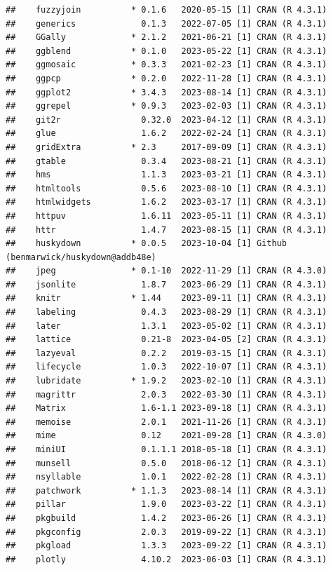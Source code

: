 \documentclass[print]{nuthesis}
\begin{document}
\begin{verbatim}
##    fuzzyjoin          * 0.1.6   2020-05-15 [1] CRAN (R 4.3.1)
##    generics             0.1.3   2022-07-05 [1] CRAN (R 4.3.1)
##    GGally             * 2.1.2   2021-06-21 [1] CRAN (R 4.3.1)
##    ggblend            * 0.1.0   2023-05-22 [1] CRAN (R 4.3.1)
##    ggmosaic           * 0.3.3   2021-02-23 [1] CRAN (R 4.3.1)
##    ggpcp              * 0.2.0   2022-11-28 [1] CRAN (R 4.3.1)
##    ggplot2            * 3.4.3   2023-08-14 [1] CRAN (R 4.3.1)
##    ggrepel            * 0.9.3   2023-02-03 [1] CRAN (R 4.3.1)
##    git2r                0.32.0  2023-04-12 [1] CRAN (R 4.3.1)
##    glue                 1.6.2   2022-02-24 [1] CRAN (R 4.3.1)
##    gridExtra          * 2.3     2017-09-09 [1] CRAN (R 4.3.1)
##    gtable               0.3.4   2023-08-21 [1] CRAN (R 4.3.1)
##    hms                  1.1.3   2023-03-21 [1] CRAN (R 4.3.1)
##    htmltools            0.5.6   2023-08-10 [1] CRAN (R 4.3.1)
##    htmlwidgets          1.6.2   2023-03-17 [1] CRAN (R 4.3.1)
##    httpuv               1.6.11  2023-05-11 [1] CRAN (R 4.3.1)
##    httr                 1.4.7   2023-08-15 [1] CRAN (R 4.3.1)
##    huskydown          * 0.0.5   2023-10-04 [1] Github (benmarwick/huskydown@addb48e)
##    jpeg               * 0.1-10  2022-11-29 [1] CRAN (R 4.3.0)
##    jsonlite             1.8.7   2023-06-29 [1] CRAN (R 4.3.1)
##    knitr              * 1.44    2023-09-11 [1] CRAN (R 4.3.1)
##    labeling             0.4.3   2023-08-29 [1] CRAN (R 4.3.1)
##    later                1.3.1   2023-05-02 [1] CRAN (R 4.3.1)
##    lattice              0.21-8  2023-04-05 [2] CRAN (R 4.3.1)
##    lazyeval             0.2.2   2019-03-15 [1] CRAN (R 4.3.1)
##    lifecycle            1.0.3   2022-10-07 [1] CRAN (R 4.3.1)
##    lubridate          * 1.9.2   2023-02-10 [1] CRAN (R 4.3.1)
##    magrittr             2.0.3   2022-03-30 [1] CRAN (R 4.3.1)
##    Matrix               1.6-1.1 2023-09-18 [1] CRAN (R 4.3.1)
##    memoise              2.0.1   2021-11-26 [1] CRAN (R 4.3.1)
##    mime                 0.12    2021-09-28 [1] CRAN (R 4.3.0)
##    miniUI               0.1.1.1 2018-05-18 [1] CRAN (R 4.3.1)
##    munsell              0.5.0   2018-06-12 [1] CRAN (R 4.3.1)
##    nsyllable            1.0.1   2022-02-28 [1] CRAN (R 4.3.1)
##    patchwork          * 1.1.3   2023-08-14 [1] CRAN (R 4.3.1)
##    pillar               1.9.0   2023-03-22 [1] CRAN (R 4.3.1)
##    pkgbuild             1.4.2   2023-06-26 [1] CRAN (R 4.3.1)
##    pkgconfig            2.0.3   2019-09-22 [1] CRAN (R 4.3.1)
##    pkgload              1.3.3   2023-09-22 [1] CRAN (R 4.3.1)
##    plotly               4.10.2  2023-06-03 [1] CRAN (R 4.3.1)

\end{verbatim}
\end{document}
